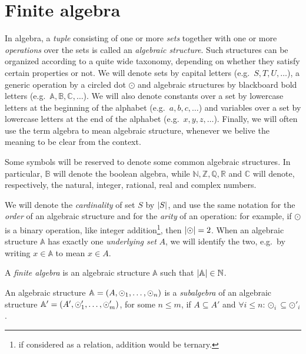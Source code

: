 \section{Finite algebra}\label{sec:prime_fields}
In algebra, a \emph{tuple} consisting of one or more \emph{sets} together with one or more 
\emph{operations} over the sets is called an \emph{algebraic structure}.
Such structures can be organized according to a quite wide taxonomy, depending on whether 
they satisfy certain properties or not. 
We will denote sets by capital letters (e.g.\  \(S, T, U, \dots \)), a generic operation by a 
circled dot \(\odot \) and algebraic structures by blackboard bold letters 
(e.g.\  \(\mathbb{A}, \mathbb{B}, \mathbb{C}, \dots \)).
We will also denote constants over a set by lowercase letters at the beginning of the alphabet 
(e.g.\  \(a, b, c, \dots \)) and variables over a set by lowercase letters at the end of the 
alphabet (e.g.\  \(x, y, z, \dots \)).
Finally, we will often use the term algebra to mean algebraic structure, whenever we belive the 
meaning to be clear from the context.
\begin{remark}
  Some symbols will be reserved to denote some common algebraic structures. 
  In particular, \(\mathbb{B}\) will denote the boolean algebra, while \(\mathbb{N}, \mathbb{Z}, 
  \mathbb{Q}, \mathbb{R}\) and \(\mathbb{C}\) will denote, respectively, the 
  natural, integer, rational, real and complex numbers.
\end{remark}

We will denote the \emph{cardinality} of set \(S\) by \(\left\lvert S\right\rvert\), and use the same notation for 
the \emph{order} of an algebraic structure and for the \emph{arity} of an operation: for example, 
if \(\odot \) is a binary operation, like integer 
addition\footnote{if considered as a relation, addition would be ternary.}, then \(\left\lvert\odot\right\rvert = 2\).
When an algebraic structure \(\mathbb{A}\) has exactly one \emph{underlying set} \(A\), we will 
identify the two, e.g.\ by writing \(x \in \mathbb{A}\) to mean \(x \in A\).

\begin{definition}
  A \emph{finite algebra} is an algebraic structure \(\mathbb{A}\) such that 
  \(\left\lvert\mathbb{A}\right\rvert \in \mathbb{N}\).
\end{definition}
\begin{definition}[Subalgebra]
  An algebraic structure \(\mathbb{A} = \left(A, \odot_1, \dots, \odot_n\right)\) is a \emph{subalgebra} 
  of an algebraic structure \(\mathbb{A}' = \left(A', \odot'_1, \dots, \odot'_m\right)\), 
  for some \(n \le m\), if \(A \subseteq A'\) and 
  \(\forall i \le n\colon \odot_i \subseteq \odot'_i\).
\end{definition}

